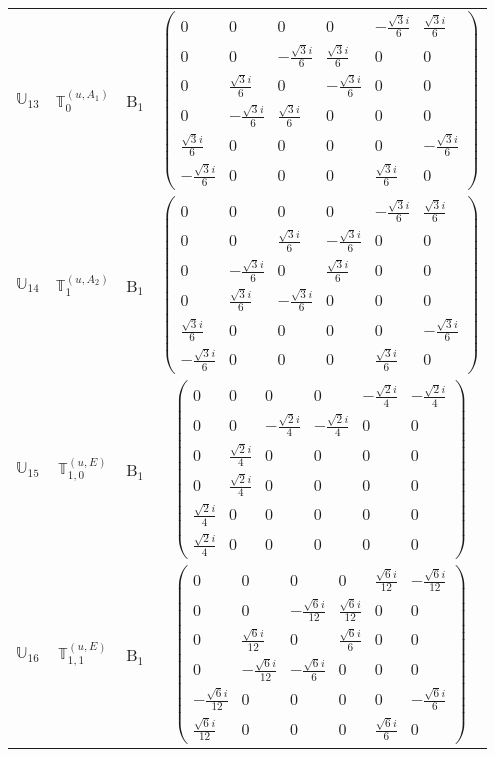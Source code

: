 \documentclass[fleqn,10pt,landscape]{article}
\begin{document}
\begin{itemize}
\begin{center}
\begin{longtable}{c|c|c|c}
$ \mathbb{U}_{13} $ & $\mathbb{T}_{0}^{(u,A_{1})}$ & B$_{1}$ & $\begin{pmatrix} 0 & 0 & 0 & 0 & - \frac{\sqrt{3} i}{6} & \frac{\sqrt{3} i}{6} \\ 0 & 0 & - \frac{\sqrt{3} i}{6} & \frac{\sqrt{3} i}{6} & 0 & 0 \\ 0 & \frac{\sqrt{3} i}{6} & 0 & - \frac{\sqrt{3} i}{6} & 0 & 0 \\ 0 & - \frac{\sqrt{3} i}{6} & \frac{\sqrt{3} i}{6} & 0 & 0 & 0 \\ \frac{\sqrt{3} i}{6} & 0 & 0 & 0 & 0 & - \frac{\sqrt{3} i}{6} \\ - \frac{\sqrt{3} i}{6} & 0 & 0 & 0 & \frac{\sqrt{3} i}{6} & 0 \end{pmatrix}$ \\
$ \mathbb{U}_{14} $ & $\mathbb{T}_{1}^{(u,A_{2})}$ & B$_{1}$ & $\begin{pmatrix} 0 & 0 & 0 & 0 & - \frac{\sqrt{3} i}{6} & \frac{\sqrt{3} i}{6} \\ 0 & 0 & \frac{\sqrt{3} i}{6} & - \frac{\sqrt{3} i}{6} & 0 & 0 \\ 0 & - \frac{\sqrt{3} i}{6} & 0 & \frac{\sqrt{3} i}{6} & 0 & 0 \\ 0 & \frac{\sqrt{3} i}{6} & - \frac{\sqrt{3} i}{6} & 0 & 0 & 0 \\ \frac{\sqrt{3} i}{6} & 0 & 0 & 0 & 0 & - \frac{\sqrt{3} i}{6} \\ - \frac{\sqrt{3} i}{6} & 0 & 0 & 0 & \frac{\sqrt{3} i}{6} & 0 \end{pmatrix}$ \\
$ \mathbb{U}_{15} $ & $\mathbb{T}_{1,0}^{(u,E)}$ & B$_{1}$ & $\begin{pmatrix} 0 & 0 & 0 & 0 & - \frac{\sqrt{2} i}{4} & - \frac{\sqrt{2} i}{4} \\ 0 & 0 & - \frac{\sqrt{2} i}{4} & - \frac{\sqrt{2} i}{4} & 0 & 0 \\ 0 & \frac{\sqrt{2} i}{4} & 0 & 0 & 0 & 0 \\ 0 & \frac{\sqrt{2} i}{4} & 0 & 0 & 0 & 0 \\ \frac{\sqrt{2} i}{4} & 0 & 0 & 0 & 0 & 0 \\ \frac{\sqrt{2} i}{4} & 0 & 0 & 0 & 0 & 0 \end{pmatrix}$ \\
$ \mathbb{U}_{16} $ & $\mathbb{T}_{1,1}^{(u,E)}$ & B$_{1}$ & $\begin{pmatrix} 0 & 0 & 0 & 0 & \frac{\sqrt{6} i}{12} & - \frac{\sqrt{6} i}{12} \\ 0 & 0 & - \frac{\sqrt{6} i}{12} & \frac{\sqrt{6} i}{12} & 0 & 0 \\ 0 & \frac{\sqrt{6} i}{12} & 0 & \frac{\sqrt{6} i}{6} & 0 & 0 \\ 0 & - \frac{\sqrt{6} i}{12} & - \frac{\sqrt{6} i}{6} & 0 & 0 & 0 \\ - \frac{\sqrt{6} i}{12} & 0 & 0 & 0 & 0 & - \frac{\sqrt{6} i}{6} \\ \frac{\sqrt{6} i}{12} & 0 & 0 & 0 & \frac{\sqrt{6} i}{6} & 0 \end{pmatrix}$ \\

\end{longtable}
\end{center}
\end{itemize}
\end{document}

